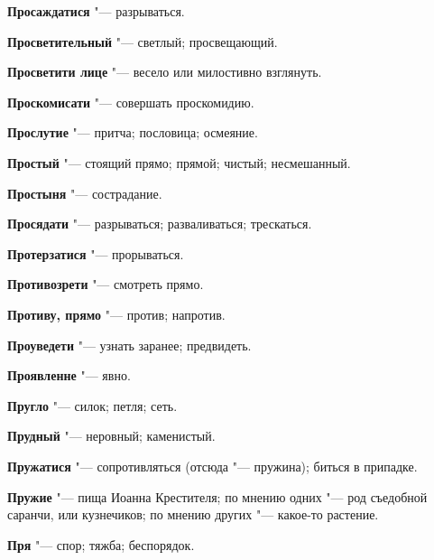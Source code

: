 \begin{mymulticols}{2}
\noindent\textbf{Просаждатися} "--- разрываться. 




\noindent\textbf{Просветительный} "--- светлый; просвещающий. 




\noindent\textbf{Просветити лице} "--- весело или милостивно взглянуть. 




\noindent\textbf{Проскомисати} "--- совершать проскомидию. 




\noindent\textbf{Прослутие} "--- притча; пословица; осмеяние. 




\noindent\textbf{Простый} "--- стоящий прямо; прямой; чистый; несмешанный. 




\noindent\textbf{Простыня} "--- сострадание. 




\noindent\textbf{Просядати} "--- разрываться; разваливаться; трескаться. 




\noindent\textbf{Протерзатися} "--- прорываться. 




\noindent\textbf{Противозрети} "--- смотреть прямо. 




\noindent\textbf{Противу, прямо} "--- против; напротив. 




\noindent\textbf{Проуведети} "--- узнать заранее; предвидеть. 




\noindent\textbf{Проявленне} "--- явно. 




\noindent\textbf{Пругло} "--- силок; петля; сеть. 




\noindent\textbf{Прудный} "--- неровный; каменистый. 




\noindent\textbf{Пружатися} "--- сопротивляться (отсюда "--- пружина); биться в припадке. 




\noindent\textbf{Пружие} "--- пища Иоанна Крестителя; по мнению одних "--- род съедобной саранчи, или кузнечиков; по мнению других "--- какое-то растение. 




\noindent\textbf{Пря} "--- спор; тяжба; беспорядок. 





\end{mymulticols}
